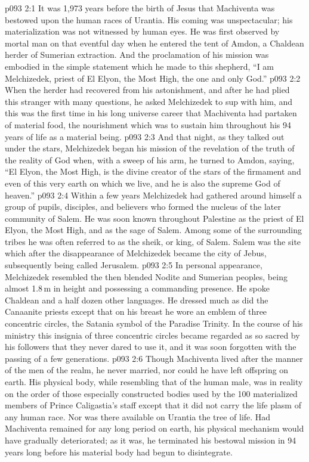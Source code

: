 \vs p093 2:1 It was 1,973 years before the birth of Jesus that Machiventa was bestowed upon the human races of Urantia. His coming was unspectacular; his materialization was not witnessed by human eyes. He was first observed by mortal man on that eventful day when he entered the tent of Amdon, a Chaldean herder of Sumerian extraction. And the proclamation of his mission was embodied in the simple statement which he made to this shepherd, “I am Melchizedek, priest of El Elyon, the Most High, the one and only God.”
\vs p093 2:2 When the herder had recovered from his astonishment, and after he had plied this stranger with many questions, he asked Melchizedek to sup with him, and this was the first time in his long universe career that Machiventa had partaken of material food, the nourishment which was to sustain him throughout his 94 years of life as a material being.
\vs p093 2:3 And that night, as they talked out under the stars, Melchizedek began his mission of the revelation of the truth of the reality of God when, with a sweep of his arm, he turned to Amdon, saying, “El Elyon, the Most High, is the divine creator of the stars of the firmament and even of this very earth on which we live, and he is also the supreme God of heaven.”
\vs p093 2:4 \pc Within a few years Melchizedek had gathered around himself a group of pupils, disciples, and believers who formed the nucleus of the later community of Salem. He was soon known throughout Palestine as the priest of El Elyon, the Most High, and as the sage of Salem. Among some of the surrounding tribes he was often referred to as the sheik, or king, of Salem. Salem was the site which after the disappearance of Melchizedek became the city of Jebus, subsequently being called Jerusalem.
\vs p093 2:5 \pc In personal appearance, Melchizedek resembled the then blended Nodite and Sumerian peoples, being almost 1.8\,m in height and possessing a commanding presence. He spoke Chaldean and a half dozen other languages. He dressed much as did the Canaanite priests except that on his breast he wore an emblem of three concentric circles, the Satania symbol of the Paradise Trinity. In the course of his ministry this insignia of three concentric circles became regarded as so sacred by his followers that they never dared to use it, and it was soon forgotten with the passing of a few generations.
\vs p093 2:6 Though Machiventa lived after the manner of the men of the realm, he never married, nor could he have left offspring on earth. His physical body, while resembling that of the human male, was in reality on the order of those especially constructed bodies used by the 100 materialized members of Prince Caligastia’s staff except that it did not carry the life plasm of any human race. Nor was there available on Urantia the tree of life. Had Machiventa remained for any long period on earth, his physical mechanism would have gradually deteriorated; as it was, he terminated his bestowal mission in 94 years long before his material body had begun to disintegrate.
